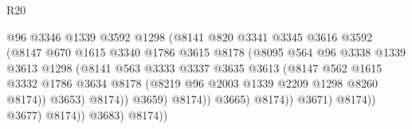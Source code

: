 \begin{lexlean}{R20}
\begin{coremodule}
                                          @96
                                          @3346
                                          @1339
                                          @3592
                                          @1298
                                          (@8141
                                            @820
                                            @3341
                                            @3345
                                            @3616
                                            @3592
                                            (@8147
                                              @670
                                              @1615
                                              @3340
                                              @1786
                                              @3615
                                              @8178
                                              (@8095
                                                @564
                                                @96
                                                @3338
                                                @1339
                                                @3613
                                                @1298
                                                (@8141
                                                  @563
                                                  @3333
                                                  @3337
                                                  @3635
                                                  @3613
                                                  (@8147
                                                    @562
                                                    @1615
                                                    @3332
                                                    @1786
                                                    @3634
                                                    @8178
                                                    (@8219 @96 @2003 @1339 @2209 @1298 @8260 @8174))
                                                  @3653)
                                                @8174))
                                            @3659)
                                          @8174))
                                      @3665)
                                    @8174))
                                @3671)
                              @8174))
                          @3677)
                        @8174))
                    @3683)
                  @8174))

\end{coremodule}
\end{lexlean}
